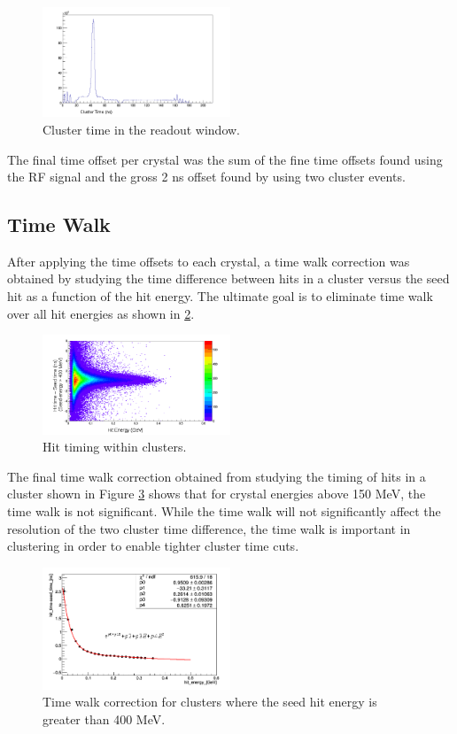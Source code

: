 \documentclass[twoside]{article}
\begin{document}
\begin{multicols}{2}
\begin{figure}[H]
  \centering
      \includegraphics[width=0.5\textwidth]{t1.png}
  \caption{Cluster time in the readout window.}
\label{fig:ctime}
\end{figure}


The final time offset per crystal was the sum of the fine time offsets found using the RF signal and the gross 2 ns offset found by using two cluster events. 
\subsection{Time Walk}
After applying the time offsets to each crystal, a time walk correction was obtained by studying the time difference between hits in a cluster versus the seed hit as a function of the hit energy. The ultimate goal is to eliminate time walk over all hit energies as shown in \ref{fig:hitincluster}. 

\begin{figure}[H]
  \centering
      \includegraphics[width=0.5\textwidth]{hitIncluster_corr.png}
  \caption{Hit timing within clusters.}
\label{fig:hitincluster}
\end{figure}

The final time walk correction obtained from studying the timing of hits in a cluster shown in Figure \ref{fig:twalk}  shows that for crystal energies above 150 MeV, the time walk is not significant. While the time walk will not significantly affect the resolution of the two cluster time difference, the time walk is important in clustering in order to enable tighter cluster time cuts. \\
\begin{figure}[H]
  \centering
      \includegraphics[width=0.5\textwidth]{twalk.png}
  \caption{Time walk correction for clusters where the seed hit energy is greater than 400 MeV.}
  \label{fig:twalk}
\end{figure}


\end{multicols}
\end{document}
